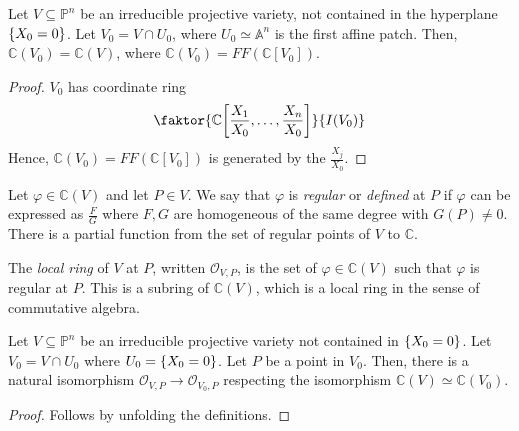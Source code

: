 \begin{corollary}
    Let \( V \subseteq \mathbb P^n \) be an irreducible projective variety, not contained in the hyperplane \( \qty{X_0 = 0} \).
    Let \( V_0 = V \cap U_0 \), where \( U_0 \simeq \mathbb A^n \) is the first affine patch.
    Then, \( \mathbb C(V_0) = \mathbb C(V) \), where \( \mathbb C(V_0) = FF(\mathbb C[V_0]) \).
\end{corollary}
\begin{proof}
    \( V_0 \) has coordinate ring
    \[ \faktor{\mathbb C\qty[\frac{X_1}{X_0}, \dots, \frac{X_n}{X_0}]}{I(V_0)} \]
    Hence, \( \mathbb C(V_0) = FF(\mathbb C[V_0]) \) is generated by the \( \frac{X_j}{X_0} \).
\end{proof}
\begin{definition}
    Let \( \varphi \in \mathbb C(V) \) and let \( P \in V \).
    We say that \( \varphi \) is \emph{regular} or \emph{defined} at \( P \) if \( \varphi \) can be expressed as \( \frac{F}{G} \) where \( F, G \) are homogeneous of the same degree with \( G(P) \neq 0 \).
    There is a partial function from the set of regular points of \( V \) to \( \mathbb C \).
\end{definition}
\begin{definition}
    The \emph{local ring} of \( V \) at \( P \), written \( \mathcal O_{V,P} \), is the set of \( \varphi \in \mathbb C(V) \) such that \( \varphi \) is regular at \( P \).
    This is a subring of \( \mathbb C(V) \), which is a local ring in the sense of commutative algebra.
\end{definition}
\begin{proposition}
    Let \( V \subseteq \mathbb P^n \) be an irreducible projective variety not contained in \( \qty{X_0 = 0} \).
    Let \( V_0 = V \cap U_0 \) where \( U_0 = \qty{X_0 = 0} \).
    Let \( P \) be a point in \( V_0 \).
    Then, there is a natural isomorphism \( \mathcal O_{V,P} \to \mathcal O_{V_0,P} \) respecting the isomorphism \( \mathbb C(V) \simeq \mathbb C(V_0) \).
\end{proposition}
\begin{proof}
    Follows by unfolding the definitions.
\end{proof}

